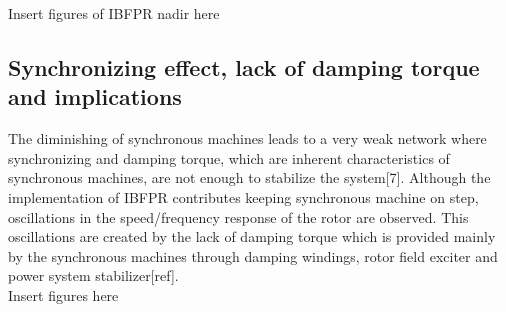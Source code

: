 Insert figures of IBFPR nadir here\\



\subsection{Synchronizing effect, lack of damping torque and implications}

The diminishing of synchronous machines leads to a very weak network where synchronizing and damping torque, which are inherent characteristics of synchronous machines, are not enough to stabilize the system[7]. Although the implementation of IBFPR contributes keeping synchronous machine on step, oscillations in the speed/frequency response of the rotor are observed. This oscillations are created by the lack of damping torque which is provided mainly by the synchronous machines through damping windings, rotor field exciter and power system stabilizer[ref]. \\

Insert figures here

